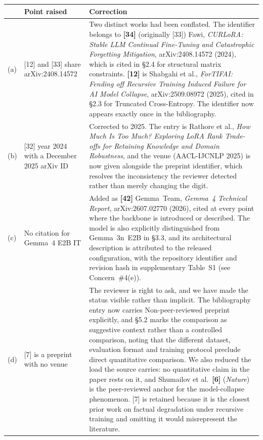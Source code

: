 \documentclass[11pt,a4paper]{article}
\newcommand{\newtext}[1]{#1}
\newcommand{\newtext}[1]{\textcolor{chgcolor}{``#1''}}
\begin{document}
\renewcommand{\arraystretch}{1.25}
\begin{longtable}{@{}L{0.5cm}L{3.3cm}L{10.3cm}@{}}
\toprule
{} & \textbf{Point raised} & \textbf{Correction} \\
\midrule
\endfirsthead
\bottomrule
\endfoot

(a) & [12] and [33] share arXiv:2408.14572 &
Two distinct works had been conflated. The identifier belongs to
\textbf{[34]} (originally [33]) Fawi, \emph{CURLoRA: Stable LLM Continual Fine-Tuning and
Catastrophic Forgetting Mitigation}, arXiv:2408.14572 (2024), which is
cited in \S2.4 for structural matrix constraints. \textbf{[12]} is
Shabgahi et al., \emph{ForTIFAI: Fending off Recursive Training Induced
Failure for AI Model Collapse}, arXiv:2509.08972 (2025), cited in \S2.3
for Truncated Cross-Entropy. The identifier now appears exactly once in
the bibliography. \\

(b) & [32] year 2024 with a December 2025 arXiv ID &
Corrected to 2025. The entry is Rathore et al., \emph{How Much Is Too
Much? Exploring LoRA Rank Trade-offs for Retaining Knowledge and Domain
Robustness}, and the venue (AACL-IJCNLP 2025) is now given
alongside the preprint identifier, which resolves the inconsistency the
reviewer detected rather than merely changing the digit. \\

(c) & No citation for Gemma~4 E2B IT &
Added as \textbf{[42]} Gemma~Team, \emph{Gemma~4 Technical Report},
arXiv:2607.02770 (2026), cited at every point where the backbone is
introduced or described. The model is also explicitly distinguished from
Gemma~3n~E2B in \S3.3, and its architectural description is attributed to
the released configuration, with the repository identifier and revision
hash in supplementary Table~S1 (see Concern~\#4(e)). \\

(d) & [7] is a preprint with no venue &
The reviewer is right to ask, and we have made the status visible rather
than implicit. The bibliography entry now carries \newtext{Non-peer-reviewed
preprint} explicitly, and \S5.2 marks the comparison as
\newtext{suggestive context rather than a controlled comparison}, noting
that the different dataset, evaluation format and training protocol
preclude direct quantitative comparison. We also reduced the load the
source carries: no quantitative claim in the paper rests on it, and
Shumailov et al.~\textbf{[6]} (\emph{Nature}) is the peer-reviewed anchor
for the model-collapse phenomenon. [7] is retained because it is the
closest prior work on factual degradation under recursive training and
omitting it would misrepresent the literature. \\


\end{longtable}
\end{document}
